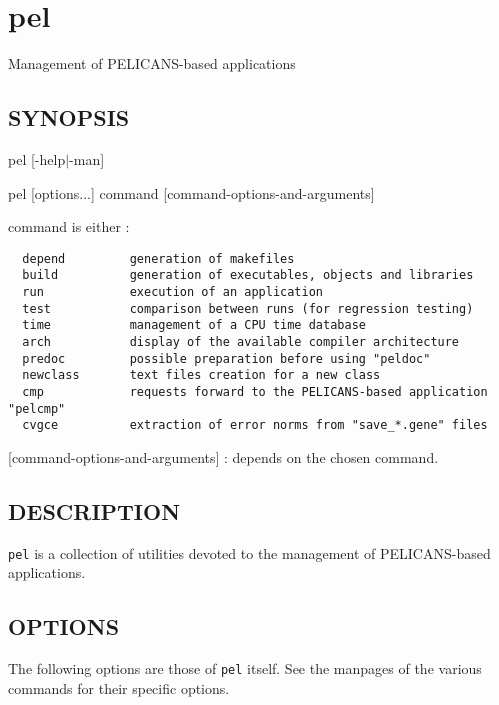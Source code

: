 \documentclass{article}
\begin{document}
\tableofcontents

\clearpage
\section{pel\label{pel}}


Management of PELICANS-based applications

\subsection*{SYNOPSIS\label{pel_SYNOPSIS}}


pel [-help$|$-man]



pel [options...] command [command-options-and-arguments]



command is either :

\begin{verbatim}
  depend         generation of makefiles
  build          generation of executables, objects and libraries
  run            execution of an application
  test           comparison between runs (for regression testing)
  time           management of a CPU time database
  arch           display of the available compiler architecture
  predoc         possible preparation before using "peldoc"
  newclass       text files creation for a new class
  cmp            requests forward to the PELICANS-based application "pelcmp"
  cvgce          extraction of error norms from "save_*.gene" files
\end{verbatim}


[command-options-and-arguments] : depends on the chosen command.

\subsection*{DESCRIPTION\label{pel_DESCRIPTION}}


\texttt{pel} is a collection of utilities devoted to the management
of PELICANS-based applications.

\subsection*{OPTIONS\label{pel_OPTIONS}}


The following options are those of \texttt{pel} itself. See the
manpages of the various commands for their specific options.
\end{document}
